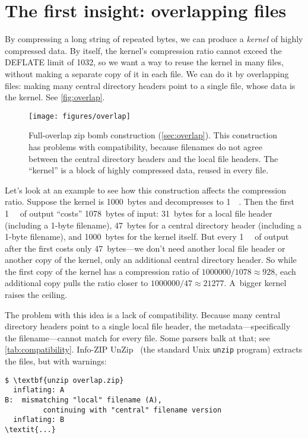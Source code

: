 \documentclass[letterpaper,twocolumn,10pt]{article}
\newcommand{\MB}{\mega\byte}
\begin{document}
\section{The first insight: overlapping files}
\label{sec:overlap}

By compressing a long string of repeated bytes,
we can produce a \emph{kernel}
of highly compressed data.
By itself, the kernel's compression ratio cannot
exceed the DEFLATE limit of \num{1032},
so we want a way to reuse the kernel in many files,
without making a separate copy of it in each file.
We can do it by overlapping files:
making many central directory headers point to
a single file, whose data is the kernel.
See \autoref{fig:overlap}.

\begin{figure*}
\texttt{[image: figures/overlap]}
\caption{
Full-overlap zip bomb construction
(\autoref{sec:overlap}).
This construction has problems with compatibility,
because filenames do not agree between the
central directory headers and the local file headers.
The ``kernel'' is a block of highly compressed data,
reused in every file.
}
\label{fig:overlap}
\end{figure*}

Let's look at an example to see how this construction affects the compression ratio.
Suppose the kernel is \SI{1000}{bytes} and
decompresses to \SI{1}{\MB}.
Then the first \SI{1}{\MB} of output ``costs''
\SI{1078}{bytes} of input:
\SI{31}{bytes} for a local file header (including a 1-byte filename),
\SI{47}{bytes} for a central directory header (including a 1-byte filename), and
\SI{1000}{bytes} for the kernel itself.
But every \SI{1}{\MB} of output
after the first costs only \SI{47}{bytes}---we don't need another local file header or another copy of the kernel,
only an additional central directory header.
So while the first copy of the kernel has a compression ratio of
$\num{1000000}/\num{1078}\approx \num{928}$,
each additional copy pulls the ratio closer to
$\num{1000000}/\num{47}\approx \num{21277}$.
A~bigger kernel raises the ceiling.

The problem with this idea is a lack of compatibility.
Because many central directory headers point to a single local file header,
the metadata---specifically the filename---cannot match for every file.
Some parsers balk at that; see \autoref{tab:compatibility}.
Info-ZIP UnZip~\cite{infozip-unzip}
(the standard Unix \texttt{unzip} program)
extracts the files, but with warnings:

{\small
\begin{Verbatim}[commandchars=\\\{\}]
$ \textbf{unzip overlap.zip}
  inflating: A
B:  mismatching "local" filename (A),
         continuing with "central" filename version
  inflating: B
\textit{...}
\end{Verbatim}
}
\end{document}
